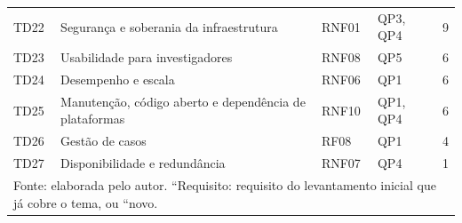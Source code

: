 \begin{small}
\begin{longtable}{lp{6.8cm}llr}
TD22 & Segurança e soberania da infraestrutura & RNF01 & QP3, QP4 & 9 \\
TD23 & Usabilidade para investigadores & RNF08 & QP5 & 6 \\
TD24 & Desempenho e escala & RNF06 & QP1 & 6 \\
TD25 & Manutenção, código aberto e dependência de plataformas & RNF10 & QP1, QP4 & 6 \\
TD26 & Gestão de casos & RF08 & QP1 & 4 \\
TD27 & Disponibilidade e redundância & RNF07 & QP4 & 1 \\
\hline
\multicolumn{5}{p{13cm}}{\footnotesize Fonte: elaborada pelo autor. ``Requisito: requisito do levantamento inicial que já cobre o tema, ou ``novo.}\
\end{longtable}
\end{small}
